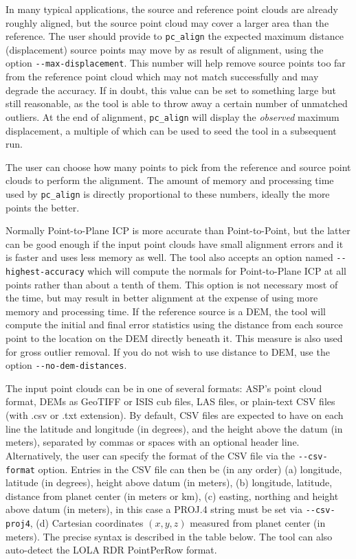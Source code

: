 In many typical applications, the source and reference point clouds are
already roughly aligned, but the source point cloud may cover a larger
area than the reference. The user should provide to \texttt{pc\_align}
the expected maximum distance (displacement) source points may move by
as result of alignment, using the option
\texttt{-\/-max-displacement}. This number will help remove source
points too far from the reference point cloud which may not match
successfully and may degrade the accuracy. If in doubt, this value can
be set to something large but still reasonable, as the tool is able to
throw away a certain number of unmatched outliers. At the end of
alignment, \texttt{pc\_align} will display the {\it observed} maximum
displacement, a multiple of which can be used to seed the tool in a
subsequent run.

The user can choose how many points to pick from the reference and
source point clouds to perform the alignment. The amount of memory and
processing time used by \texttt{pc\_align} is directly proportional to
these numbers, ideally the more points the better.

Normally Point-to-Plane ICP is more accurate than Point-to-Point, but
the latter can be good enough if the input point clouds have small
alignment errors and it is faster and uses less memory as well.  The
tool also accepts an option named \texttt{-\/-highest-accuracy} which
will compute the normals for Point-to-Plane ICP at all points rather
than about a tenth of them. This option is not necessary most of the
time, but may result in better alignment at the expense of using more
memory and processing time. If the reference source is a DEM, the
tool will compute the initial and final error statistics using the
distance from each source point to the location on the DEM directly
beneath it. This measure is also used for gross outlier removal.  If
you do not wish to use distance to DEM, use the option
\texttt{-\/-no-dem-distances}.

The input point clouds can be in one of several formats: ASP's point
cloud format, DEMs as GeoTIFF or ISIS cub files, LAS files, or
plain-text CSV files (with .csv or .txt extension). By default, CSV
files are expected to have on each line the latitude and longitude (in
degrees), and the height above the datum (in meters), separated by
commas or spaces with an optional header line. Alternatively, the user
can specify the format of the CSV file via the \texttt{-\/-csv-format}
option. Entries in the CSV file can then be (in any order) (a)
longitude, latitude (in degrees), height above datum (in meters), (b)
longitude, latitude, distance from planet center (in meters or km), (c)
easting, northing and height above datum (in meters), in this case
a PROJ.4 string must be set via \texttt{-\/-csv-proj4}, (d)
Cartesian coordinates $(x, y, z)$ measured from planet center (in
meters). The precise syntax is described in the table below. The tool
can also auto-detect the LOLA RDR PointPerRow format.


